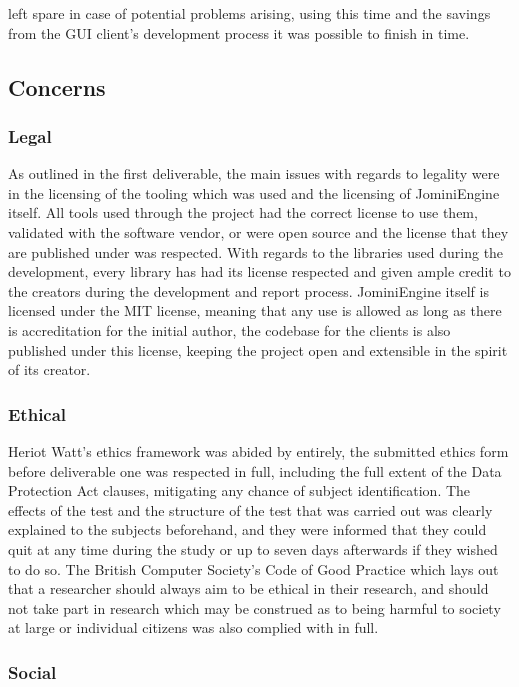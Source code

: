 \documentclass{article}
\begin{document}
left spare in case of potential problems arising, using this time and the savings from the GUI client’s development process it was possible to finish in time.

\subsection{Concerns}

\subsubsection{Legal}

As outlined in the first deliverable, the main issues with regards to legality were in the licensing of the tooling which was used and the licensing of JominiEngine itself. All tools used through the project had the correct license to use them, validated with the software vendor, or were open source and the license that they are published under was respected. With regards to the libraries used during the development, every library has had its license respected and given ample credit to the creators during the development and report process. JominiEngine itself is licensed under the MIT license, meaning that any use is allowed as long as there is accreditation for the initial author, the codebase for the clients is also published under this license, keeping the project open and extensible in the spirit of its creator. 

\subsubsection{Ethical}

Heriot Watt’s ethics framework was abided by entirely, the submitted ethics form before deliverable one was respected in full, including the full extent of the Data Protection Act clauses, mitigating any chance of subject identification. The effects of the test and the structure of the test that was carried out was clearly explained to the subjects beforehand, and they were informed that they could quit at any time during the study or up to seven days afterwards if they wished to do so. The British Computer Society's Code of Good Practice which lays out that a researcher should always aim to be ethical in their research, and should not take part in research which may be construed as to being harmful to society at large or individual citizens was also complied with in full. 

\subsubsection{Social}
\end{document}
